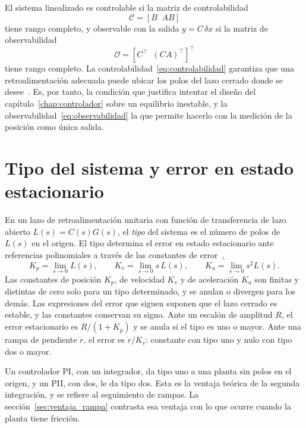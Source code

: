 El sistema linealizado es controlable si la matriz de controlabilidad
\begin{equation}
\mathcal{C}=[B\;\; AB]
\label{eq:controlabilidad}
\end{equation}
tiene rango completo, y observable con la salida $y=C\,\delta x$ si la matriz de observabilidad
\begin{equation}
\mathcal{O}=[C^\top\;\; (CA)^\top]^\top
\label{eq:observabilidad}
\end{equation}
tiene rango completo. La controlabilidad~\eqref{eq:controlabilidad} garantiza que una retroalimentación adecuada puede ubicar los polos del lazo cerrado donde se desee~\cite{ogata}. Es, por tanto, la condición que justifica intentar el diseño del capítulo~\ref{chap:controlador} sobre un equilibrio inestable, y la observabilidad~\eqref{eq:observabilidad} la que permite hacerlo con la medición de la posición como única salida.

\section{Tipo del sistema y error en estado estacionario}\label{sec:fund_tipo}

En un lazo de retroalimentación unitaria con función de transferencia de lazo abierto $L(s)=C(s)G(s)$, el \emph{tipo} del sistema es el número de polos de $L(s)$ en el origen. El tipo determina el error en estado estacionario ante referencias polinomiales a través de las constantes de error~\cite{ogata,gene},
\begin{equation}
K_p=\lim_{s\to0}L(s), \qquad K_v=\lim_{s\to0}s\,L(s), \qquad K_a=\lim_{s\to0}s^2L(s) .
\label{eq:constantes_error}
\end{equation}
Las constantes de posición $K_p$, de velocidad $K_v$ y de aceleración $K_a$ son finitas y distintas de cero solo para un tipo determinado, y se anulan o divergen para los demás. Las expresiones del error que siguen suponen que el lazo cerrado es estable, y las constantes conservan su signo. Ante un escalón de amplitud $R$, el error estacionario es $R/(1+K_p)$ y se anula si el tipo es uno o mayor. Ante una rampa de pendiente $\dot r$, el error es $\dot r/K_v$: constante con tipo uno y nulo con tipo dos o mayor.

Un controlador PI, con un integrador, da tipo uno a una planta sin polos en el origen, y un PII, con dos, le da tipo dos. Esta es la ventaja teórica de la segunda integración, y se refiere al seguimiento de rampas. La sección~\ref{sec:ventaja_rampa} contrasta esa ventaja con lo que ocurre cuando la planta tiene fricción.

